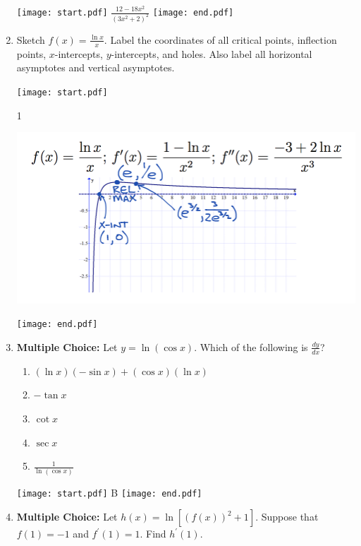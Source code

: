 \documentclass[12pt]{article}
\begin{document}
\begin{enumerate}
\texttt{[image: start.pdf]}
{{$\frac{12-18x^2}{(3x^2+2)^2}$}}
\texttt{[image: end.pdf]}


\item Sketch $f(x)=\frac{\ln{x}}{x}$.  Label  the coordinates of all critical points, inflection points, $x$-intercepts, $y$-intercepts, and holes.  Also label all horizontal asymptotes and vertical asymptotes.

\texttt{[image: start.pdf]}
{{1\linewidth}{\begin{center}
\includegraphics[scale=0.6]{9.png}
\end{center}
}}
\texttt{[image: end.pdf]}



\item {\bf Multiple Choice:} Let $y=\ln{(\cos{x})}$.  Which of the following is $\frac{dy}{dx}$?

\begin{enumerate}

\item $(\ln{x})(-\sin{x})+(\cos{x})(\ln{x})$

\item $-\tan{x}$

\item $\cot{x}$

\item $\sec{x}$

\item $\frac{1}{\ln{(\cos{x})}}$

\end{enumerate}

\texttt{[image: start.pdf]}
{{B}}
\texttt{[image: end.pdf]}


\item {\bf Multiple Choice:} Let $h(x)=\ln[(f(x))^2+1]$.  Suppose that $f(1)=-1$ and $f^{\prime}(1)=1$.  Find $h^{\prime}(1)$.

\begin{enumerate}


\end{enumerate}
\end{enumerate}
\end{document}
